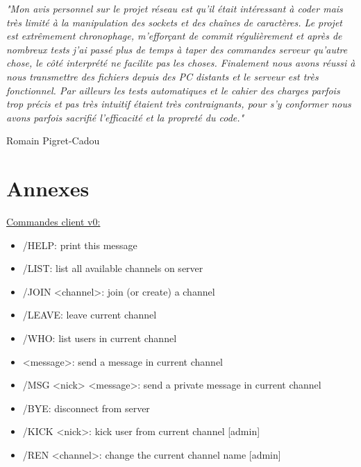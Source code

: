 \documentclass[12pt]{article}
\begin{document}
{\emph{"Mon avis personnel sur le projet réseau est qu'il était intéressant à coder
mais très limité à la manipulation des sockets et des chaînes de caractères. Le projet est extrêmement chronophage, m'efforçant de commit régulièrement et après
de nombreux tests j'ai passé plus de temps à taper des commandes serveur qu'autre chose, le côté interprété ne facilite pas les choses. Finalement nous avons réussi à nous transmettre des
fichiers depuis des PC distants et le serveur est très fonctionnel. Par ailleurs les tests automatiques et le cahier
des charges parfois trop précis et pas très intuitif étaient très contraignants, pour s'y conformer nous avons parfois sacrifié l'efficacité et la propreté du code."}
\begin{flushright}
    Romain Pigret-Cadou
\end{flushright}

\section{Annexes}
\textbf{}


{\underline{Commandes client v0:}}
\begin{itemize}
    \item /HELP: print this message
    \item /LIST: list all available channels on server
    \item /JOIN <channel>: join (or create) a channel
    \item /LEAVE: leave current channel
    \item /WHO: list users in current channel
    \item <message>: send a message in current channel
    \item /MSG <nick> <message>: send a private message in current channel
    \item /BYE: disconnect from server
    \item /KICK <nick>: kick user from current channel [admin]
    \item /REN <channel>: change the current channel name [admin]
\end{itemize}

}
\end{document}
